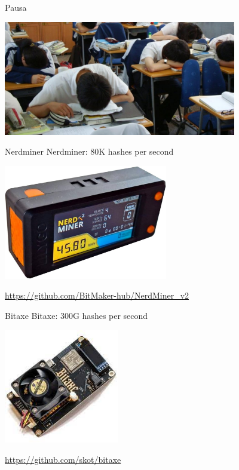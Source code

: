 \documentclass[aspectratio=169]{beamer}
\begin{document}
\begin{frame}{Pausa}
    \begin{center}
        \includegraphics[height=5cm]{pausa.jpg}
    \end{center}
\end{frame}

\begin{frame}{Nerdminer}
    Nerdminer: 80K hashes per second
    \begin{center}
        \includegraphics[height=5cm]{nerdminer.jpg}
    \end{center}
    \url{https://github.com/BitMaker-hub/NerdMiner_v2}
\end{frame}

\begin{frame}{Bitaxe}
    Bitaxe: 300G hashes per second
    \begin{center}
        \includegraphics[height=5cm]{bitaxe.jpg}
    \end{center}
    \url{https://github.com/skot/bitaxe}
\end{frame}
\end{document}
